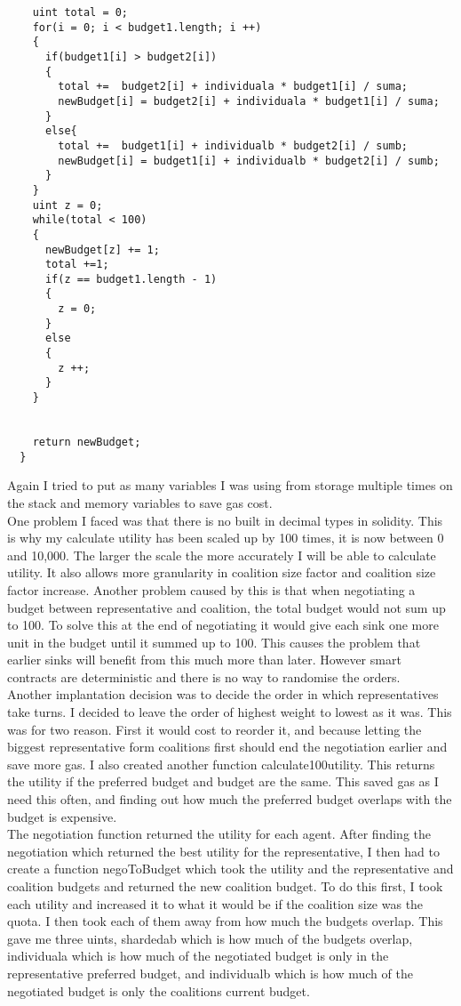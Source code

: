 \begin{lstlisting}
    uint total = 0;
    for(i = 0; i < budget1.length; i ++)
    {
      if(budget1[i] > budget2[i])
      {
        total +=  budget2[i] + individuala * budget1[i] / suma;
        newBudget[i] = budget2[i] + individuala * budget1[i] / suma;
      }
      else{
        total +=  budget1[i] + individualb * budget2[i] / sumb;
        newBudget[i] = budget1[i] + individualb * budget2[i] / sumb;
      }
    }
    uint z = 0;
    while(total < 100)
    {
      newBudget[z] += 1;
      total +=1;
      if(z == budget1.length - 1)
      {
        z = 0;
      }
      else
      {
        z ++;
      }
    }


    return newBudget;
  }
\end{lstlisting}
Again I tried to put as many variables I was using from storage multiple times on the stack and memory variables to save gas cost. \\
One problem I faced was that there is no built in decimal types in solidity. This is why my calculate utility has been scaled up by 100 times, it is now between 0 and 10,000. The larger the scale the more accurately I will be able to calculate utility. It also allows more granularity in coalition size factor and coalition size factor increase. Another problem caused by this is that when negotiating a budget between representative and coalition, the total budget would not sum up to 100. To  solve this at the end of negotiating it would give each sink one more unit in the budget until it summed up to 100. This causes the problem that earlier sinks will benefit from this much more than later. However smart contracts are deterministic and there is no way to randomise the orders. \\
Another implantation decision was to decide the order in which representatives take turns. I decided to leave the order of highest weight to lowest as it was. This was for two reason. First it would cost to reorder it, and because letting the biggest representative form coalitions first should end the negotiation earlier and save more gas.
I also created another function calculate100utility. This returns the utility if the preferred budget and budget are the same. This saved gas as I need this often, and finding out how much the preferred budget overlaps with the budget is expensive. \\
The negotiation function returned the utility for each agent. After finding the negotiation which returned the best utility for the representative, I then had to create a function negoToBudget which took the utility and the representative and coalition budgets and returned the new coalition budget. To do this first, I took each utility and increased it to what it would be if the coalition size was the quota. I then took each of them away from how much the budgets overlap. This gave me three uints,  shardedab which is how much of the budgets overlap, individuala which is how much of the negotiated budget is only in the representative preferred budget, and individualb which is how much of the negotiated budget is only the coalitions current budget. \\
